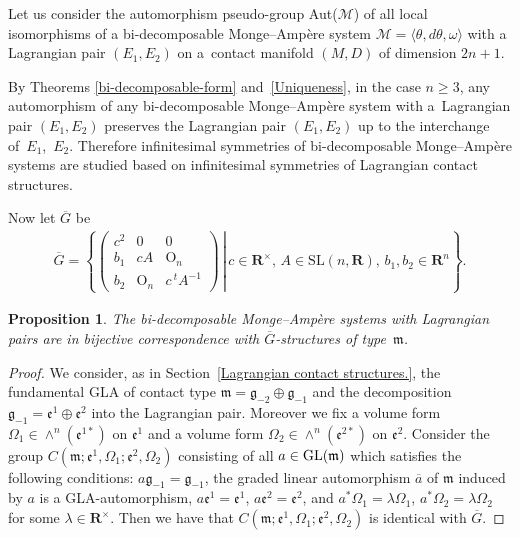 \documentclass[11pt]{article}
\newtheorem{Prop}[Th]{Proposition}
\begin{document}
Let us consider the automorphism pseudo-group Aut($\mathcal{M}$) of
all local isomorphisms of a bi-decomposable Monge--Amp{\`e}re system
$\mathcal{M} = \langle \theta, d\theta, \omega \rangle$
with a Lagrangian pair $(E_1,E_2)$
on a~contact manifold $(M,D)$ of dimension $2n+1$.

By Theorems \ref{bi-decomposable-form} and~\ref{Uniqueness}, in the case $n \geq 3$,
any automorphism of any bi-decomposable Monge--Amp{\`e}re system with a~Lagrangian pair $(E_1, E_2)$ preserves the Lagrangian pair $(E_1, E_2)$
up to the interchange of~$E_1$,~$E_2$.
Therefore inf\/initesimal symmetries
of bi-decom\-po\-sable Monge--Amp{\`e}re systems
are studied based on inf\/initesimal symmetries of Lagrangian contact structures.

Now let $\overline{G}$ be
\begin{gather*}
\overline{G} = \left\{\left. \begin{pmatrix}
                       c^2 & 0 & 0 \\
                        b_1 & cA &   \mathrm{O}_n \\
                        b_2 &   \mathrm{O}_n &   c\, {}^t\!\! A^{-1}
                    \end{pmatrix}
                    \, \right\vert \,
c \in {\mathbf{R}}^{\times}, \,A\in \mathrm{SL}(n,{\mathbf{R}}),\, b_1, b_2 \in {\mathbf{R}}^n
\right\}.
\end{gather*}

\begin{Prop}
The bi-decomposable Monge--Amp{\`e}re systems with Lagrangian pairs
are in bijective correspondence with $\overline{G}$-structures of type~$\mathfrak{m}$.
\end{Prop}

\begin{proof}
We consider, as in Section~\ref{Lagrangian contact structures.},
the fundamental GLA of contact type
$\mathfrak{m}= \mathfrak{g}_{-2}\oplus \mathfrak{g}_{-1}$ and
the decomposition
$\mathfrak{g}_{-1}=\mathfrak{e}^1\oplus \mathfrak{e}^2$ into the Lagrangian pair.
Moreover we f\/ix a volume form $\Omega_1 \in \wedge^n(\mathfrak{e}^{1*})$ on $\mathfrak{e}^1$ and
a volume form $\Omega_2 \in \wedge^n(\mathfrak{e}^{2*})$ on $\mathfrak{e}^2$.
Consider the group $C(\mathfrak{m}; \mathfrak{e}^1, \Omega_1; \mathfrak{e}^2, \Omega_2)$
consisting of all $a \in  {\rm GL}(\mathfrak{m})$ which satisf\/ies the following conditions:
$a\mathfrak{g}_{-1} = \mathfrak{g}_{-1}$,
the graded linear automorphism $\overline{a}$ of $\mathfrak{m}$ induced by $a$ is a GLA-automorphism,
$a\mathfrak{e}^1 = \mathfrak{e}^1$, $a\mathfrak{e}^2 = \mathfrak{e}^2$, and
$a^*\Omega_1 = \lambda\Omega_1$, $a^*\Omega_2 = \lambda\Omega_2$ for some $\lambda \in {\mathbf{R}}^{\times}$.
Then we have that $C(\mathfrak{m}; \mathfrak{e}^1, \Omega_1; \mathfrak{e}^2, \Omega_2)$ is identical with
$\overline{G}$.
\end{proof}
\end{document}
